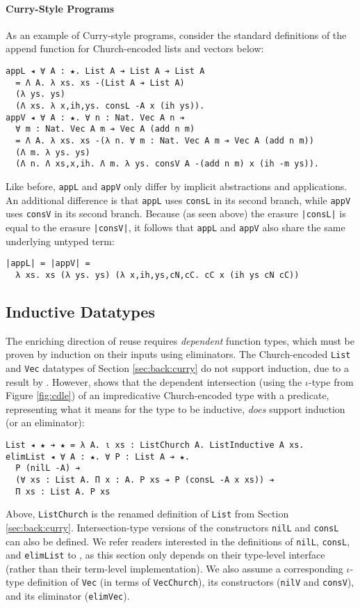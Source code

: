 \documentclass[acmsmall,screen]{acmart}
\newcommand{\refsec}[1]{Section \ref{sec:#1}}
\newcommand{\labsec}[1]{\label{sec:#1}}
\newcommand{\reffig}[1]{Figure \ref{fig:#1}}
\begin{document}

\paragraph{Curry-Style Programs}
As an example of Curry-style programs, consider the standard
definitions of the append function for Church-encoded lists and
vectors below:
\begin{verbatim}
appL ◂ ∀ A : ★. List A ➔ List A ➔ List A
  = Λ A. λ xs. xs -(List A ➔ List A)
  (λ ys. ys)
  (Λ xs. λ x,ih,ys. consL -A x (ih ys)).
appV ◂ ∀ A : ★. ∀ n : Nat. Vec A n ➔ 
  ∀ m : Nat. Vec A m ➔ Vec A (add n m)
  = Λ A. λ xs. xs -(λ n. ∀ m : Nat. Vec A m ➔ Vec A (add n m))
  (Λ m. λ ys. ys)
  (Λ n. Λ xs,x,ih. Λ m. λ ys. consV A -(add n m) x (ih -m ys)).
\end{verbatim}
Like before, \verb;appL; and \verb;appV; only differ by implicit
abstractions and applications. An additional difference is that
\verb;appL; uses \verb;consL; in its second branch, while \verb;appV; uses
\verb;consV; in its second branch. Because (as seen above)
the erasure \verb;|consL|; is equal to the erasure \verb;|consV|;, it
follows that \verb;appL; and \verb;appV; also share the same
underlying untyped term:
\begin{verbatim}
|appL| = |appV| = 
  λ xs. xs (λ ys. ys) (λ x,ih,ys,cN,cC. cC x (ih ys cN cC))
\end{verbatim}

\subsection{Inductive Datatypes}
\labsec{back:inductive}

The enriching direction of reuse requires \textit{dependent}
function types, which must be proven by induction on their inputs using
eliminators. The Church-encoded \verb;List; and \verb;Vec; datatypes
of \refsec{back:curry} do not support induction, due to a result by
\citet{geuvers01}. However, \citet{stump18} shows that the
dependent intersection (using the $\iota$-type from \reffig{cdle})
of an impredicative Church-encoded type with a
predicate, representing what it means for the type to be inductive,
\textit{does} support induction (or an eliminator):
\begin{verbatim}
List ◂ ★ ➔ ★ = λ A. ι xs : ListChurch A. ListInductive A xs.
elimList ◂ ∀ A : ★. ∀ P : List A ➔ ★.
  P (nilL -A) ➔
  (∀ xs : List A. Π x : A. P xs ➔ P (consL -A x xs)) ➔
  Π xs : List A. P xs
\end{verbatim}
Above, \verb;ListChurch; is the renamed definition of \verb;List; from
\refsec{back:curry}. Intersection-type versions of the constructors
\verb;nilL; and \verb;consL; can also be defined. We refer readers interested
in the definitions of \verb;nilL;, \verb;consL;, and \verb;elimList;
to \citet{stump18}, as this section only depends on their
type-level interface (rather than their term-level implementation). We
also assume a corresponding $\iota$-type definition of \verb;Vec;
(in terms of \verb;VecChurch;), its constructors (\verb;nilV; and
\verb;consV;), and its eliminator (\verb;elimVec;).
\end{document}

